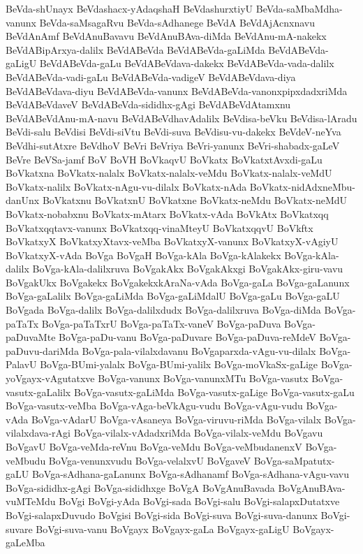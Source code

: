 {BeVda-shUnayx
BeVdashacx-yAdaqshaH
BeVdashurxtiyU
BeVda-saMbaMdha-vanunx
BeVda-saMsagaRvu
BeVda-sAdhanege
BeVdA
BeVdAjAcnxnavu
BeVdAnAmf
BeVdAnuBavavu
BeVdAnuBAva-diMda
BeVdAnu-mA-nakekx
BeVdABipArxya-dalilx
BeVdABeVda
BeVdABeVda-gaLiMda
BeVdABeVda-gaLigU
BeVdABeVda-gaLu
BeVdABeVdava-dakekx
BeVdABeVda-vada-dalilx
BeVdABeVda-vadi-gaLu
BeVdABeVda-vadigeV
BeVdABeVdava-diya
BeVdABeVdava-diyu
BeVdABeVda-vanunx
BeVdABeVda-vanonxpipxdadxriMda
BeVdABeVdaveV
BeVdABeVda-sididhx-gAgi
BeVdABeVdAtamxnu
BeVdABeVdAnu-mA-navu
BeVdABeVdhavAdalilx
BeVdisa-beVku
BeVdisa-lAradu
BeVdi-salu
BeVdisi
BeVdi-siVtu
BeVdi-suva
BeVdisu-vu-dakekx
BeVdeV-neYva
BeVdhi-sutAtxre
BeVdhoV
BeVri
BeVriya
BeVri-yanunx
BeVri-shabadx-gaLeV
BeVre
BeVSa-jamf
BoV
BoVH
BoVkaqvU
BoVkatx
BoVkatxtAvxdi-gaLu
BoVkatxna
BoVkatx-nalalx
BoVkatx-nalalx-veMdu
BoVkatx-nalalx-veMdU
BoVkatx-nalilx
BoVkatx-nAgu-vu-dilalx
BoVkatx-nAda
BoVkatx-nidAdxneMbu-danUnx
BoVkatxnu
BoVkatxnU
BoVkatxne
BoVkatx-neMdu
BoVkatx-neMdU
BoVkatx-nobabxnu
BoVkatx-mAtarx
BoVkatx-vAda
BoVkAtx
BoVkatxqq
BoVkatxqqtavx-vanunx
BoVkatxqq-vinaMteyU
BoVkatxqqvU
BoVkftx
BoVkatxyX
BoVkatxyXtavx-veMba
BoVkatxyX-vanunx
BoVkatxyX-vAgiyU
BoVkatxyX-vAda
BoVga
BoVgaH
BoVga-kAla
BoVga-kAlakekx
BoVga-kAla-dalilx
BoVga-kAla-dalilxruva
BoVgakAkx
BoVgakAkxgi
BoVgakAkx-giru-vavu
BoVgakUkx
BoVgakekx
BoVgakekxkAraNa-vAda
BoVga-gaLa
BoVga-gaLanunx
BoVga-gaLalilx
BoVga-gaLiMda
BoVga-gaLiMdalU
BoVga-gaLu
BoVga-gaLU
BoVgada
BoVga-dalilx
BoVga-dalilxdudx
BoVga-dalilxruva
BoVga-diMda
BoVga-paTaTx
BoVga-paTaTxrU
BoVga-paTaTx-vaneV
BoVga-paDuva
BoVga-paDuvaMte
BoVga-paDu-vanu
BoVga-paDuvare
BoVga-paDuva-reMdeV
BoVga-paDuvu-dariMda
BoVga-pala-vilalxdavanu
BoVgaparxda-vAgu-vu-dilalx
BoVga-PalavU
BoVga-BUmi-yalalx
BoVga-BUmi-yalilx
BoVga-moVkaSx-gaLige
BoVga-yoVgayx-vAgutatxve
BoVga-vanunx
BoVga-vanunxMTu
BoVga-vasutx
BoVga-vasutx-gaLalilx
BoVga-vasutx-gaLiMda
BoVga-vasutx-gaLige
BoVga-vasutx-gaLu
BoVga-vasutx-veMba
BoVga-vAga-beVkAgu-vudu
BoVga-vAgu-vudu
BoVga-vAda
BoVga-vAdarU
BoVga-vAsaneya
BoVga-viruvu-riMda
BoVga-vilalx
BoVga-vilalxdava-rAgi
BoVga-vilalx-vAdadxriMda
BoVga-vilalx-veMdu
BoVgavu
BoVgavU
BoVga-veMda-reVnu
BoVga-veMdu
BoVga-veMbudanenxV
BoVga-veMbudu
BoVga-venunxvudu
BoVga-velalxvU
BoVgaveV
BoVga-saMpatutx-gaLU
BoVga-sAdhana-gaLanunx
BoVga-sAdhanamf
BoVga-sAdhana-vAgu-vavu
BoVga-sididhx-gAgi
BoVga-sididhxge
BoVgA
BoVgAnuBavada
BoVgAnuBAva-vuMTeMdu
BoVgi
BoVgi-yAda
BoVgi-sada
BoVgi-salu
BoVgi-salapxDutatxve
BoVgi-salapxDuvudo
BoVgisi
BoVgi-sida
BoVgi-suva
BoVgi-suva-danunx
BoVgi-suvare
BoVgi-suva-vanu
BoVgayx
BoVgayx-gaLa
BoVgayx-gaLigU
BoVgayx-gaLeMba
}

